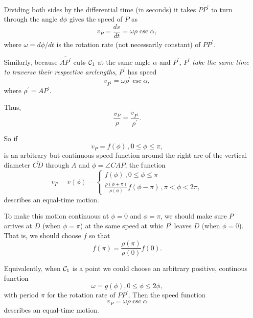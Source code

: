 \documentclass{ximera}
\begin{document}
Dividing both sides by the differential time (in seconds) it takes $\overline{PP^\prime}$ to turn through the angle $d\phi$ gives the speed of $P$ as
\begin{equation}
    v_P = \frac{ds}{dt} = \omega \rho \csc \alpha ,  \label{Eq:ConstantRate}
\end{equation}
where $\omega  = d\phi/dt$ is the rotation rate (not necessarily constant) of $\overline{PP^\prime}$.

Similarly, because $\overline{AP^\prime}$ cuts ${\cal C}_1$ at the same angle $\alpha$ and \emph{$P^\prime$, $P^\prime$ take the same time to traverse their respective arclengths}, $P^\prime$ has speed
\begin{equation}
   v_{P^\prime} =   \omega \rho^\prime  \csc \alpha ,  \label{Eq:ArcLength2}
\end{equation}
where $\rho^\prime = AP^\prime$.


Thus,
\begin{equation}
    \frac{v_P}{\rho} = \frac{v_{P^\prime}}{\rho^\prime} .  \label{Eq:SpeedCondition}
\end{equation}

So if 
\[
  v_P = f(\phi) \, , 0\leq \phi \leq \pi , 
\]
is an arbitrary but continuous speed function around the right arc of the vertical diameter $\overline{CD}$  through $A$ and $\phi = \angle CAP$, the function
\[
   v_P = v(\phi)  = 
\begin{cases}
          f(\phi) \, , 0\leq \phi \leq \pi \\
         \frac{\rho (\phi + \pi)}{\rho (\phi)} f(\phi-\pi) \, , \pi < \phi < 2\pi ,
\end{cases}
\]
describes an equal-time motion. %

To make this motion continuous at $\phi=0$ and $\phi= \pi$, we should make sure $P$ arrives at $D$ (when $\phi = \pi$) at the same speed at whic $P^\prime$ leaves $D$ (when $\phi=0$).  That is, we should choose $f$ so that 
\[
   f(\pi) =  \frac{\rho(\pi)}{\rho(0)} f(0) .
\]

Equivalently, when ${\cal C}_1$ is a point we could choose an arbitrary positive, continous function
\[
     \omega = g(\phi), 0 \leq \phi \leq 2\phi ,
\]
with period $\pi$ for the rotation rate of $PP^\prime$. Then the speed function
\[
    v_P = \omega \rho \csc\alpha %
\]
describes an equal-time motion.
\end{document}

